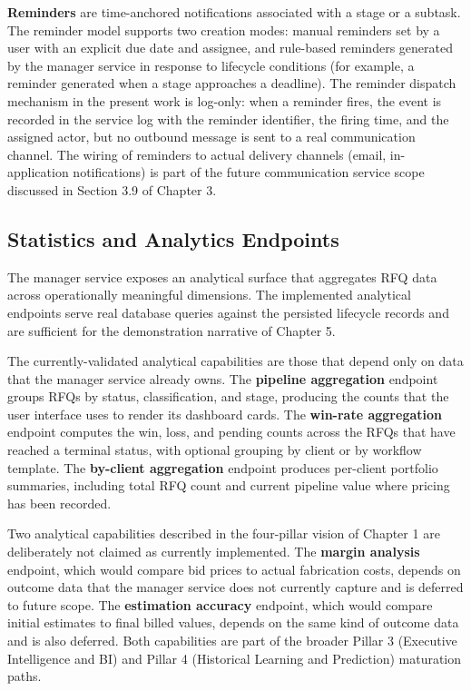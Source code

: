 \textbf{Reminders} are time-anchored notifications associated with a stage or a subtask. The reminder model supports two creation modes: manual reminders set by a user with an explicit due date and assignee, and rule-based reminders generated by the manager service in response to lifecycle conditions (for example, a reminder generated when a stage approaches a deadline). The reminder dispatch mechanism in the present work is log-only: when a reminder fires, the event is recorded in the service log with the reminder identifier, the firing time, and the assigned actor, but no outbound message is sent to a real communication channel. The wiring of reminders to actual delivery channels (email, in-application notifications) is part of the future communication service scope discussed in Section 3.9 of Chapter 3.

\subsection{Statistics and Analytics Endpoints}
The manager service exposes an analytical surface that aggregates RFQ data across operationally meaningful dimensions. The implemented analytical endpoints serve real database queries against the persisted lifecycle records and are sufficient for the demonstration narrative of Chapter 5.

The currently-validated analytical capabilities are those that depend only on data that the manager service already owns. The \textbf{pipeline aggregation} endpoint groups RFQs by status, classification, and stage, producing the counts that the user interface uses to render its dashboard cards. The \textbf{win-rate aggregation} endpoint computes the win, loss, and pending counts across the RFQs that have reached a terminal status, with optional grouping by client or by workflow template. The \textbf{by-client aggregation} endpoint produces per-client portfolio summaries, including total RFQ count and current pipeline value where pricing has been recorded.

Two analytical capabilities described in the four-pillar vision of Chapter 1 are deliberately not claimed as currently implemented. The \textbf{margin analysis} endpoint, which would compare bid prices to actual fabrication costs, depends on outcome data that the manager service does not currently capture and is deferred to future scope. The \textbf{estimation accuracy} endpoint, which would compare initial estimates to final billed values, depends on the same kind of outcome data and is also deferred. Both capabilities are part of the broader Pillar 3 (Executive Intelligence and BI) and Pillar 4 (Historical Learning and Prediction) maturation paths.

